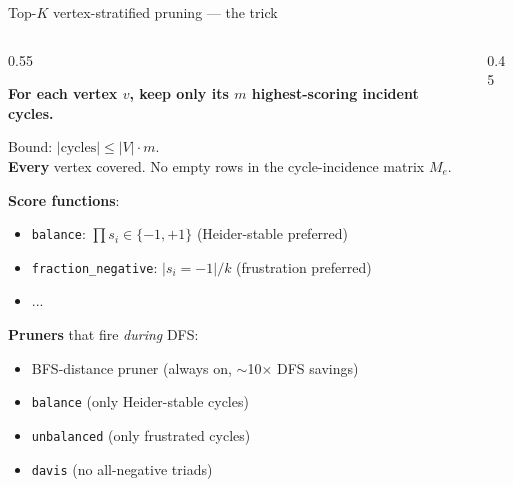 \documentclass[10pt,aspectratio=169]{beamer}
\newcommand{\code}[1]{\texttt{\small #1}}
\begin{document}
\begin{frame}{Top-$K$ vertex-stratified pruning --- the trick}

\begin{columns}[T]
\begin{column}{0.55\textwidth}

\textbf{For each vertex $v$, keep only its $m$ highest-scoring
incident cycles.}

\smallskip

Bound: $|\text{cycles}| \leq |V| \cdot m$.\\
\textbf{Every} vertex covered. No empty rows in the cycle-incidence
matrix $M_e$.

\medskip

\textbf{Score functions}:
\begin{itemize}
\item \code{balance}: $\prod s_i \in \{-1, +1\}$ (Heider-stable preferred)
\item \code{fraction\_negative}: $|s_i = -1| / k$ (frustration preferred)
\item ...
\end{itemize}

\medskip

\textbf{Pruners} that fire \emph{during} DFS:
\begin{itemize}
\item BFS-distance pruner (always on, $\sim$10$\times$ DFS savings)
\item \code{balance} (only Heider-stable cycles)
\item \code{unbalanced} (only frustrated cycles)
\item \code{davis} (no all-negative triads)
\end{itemize}

\end{column}
\begin{column}{0.45\textwidth}
\centering
{}
\end{column}
\end{columns}
\end{frame}
\end{document}
